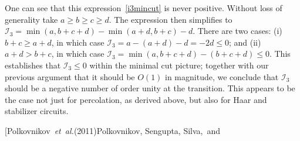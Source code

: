 \documentclass[prl,twocolumn,aps,showpacs,amsmath,amssymb,superscriptaddress,floatfix,longbibliography]{revtex4-1}
\begin{document}
One can see that this expression~\eqref{i3mincut} is never positive. Without loss of generality take $a \geq b \geq c \geq d$. The expression then simplifies to $\mathcal{I}_3 = \min(a, b + c + d)  - \min(a + d, b + c) - d$. There are two cases: (i)~$b + c \geq a + d$, in which case $\mathcal{I}_3 = a - (a + d) - d = - 2d \leq 0$; and (ii)~$a + d > b + c$, in which case $\mathcal{I}_3 = \min(a, b+c+d) - (b + c + d) \leq 0$. This establishes that $\mathcal{I}_3 \leq 0$ within the minimal cut picture; together with our previous argument that it should be $O(1)$ in magnitude, we conclude that $\mathcal{I}_3$ should be a negative number of order unity at the transition. This appears to be the case not just for percolation, as derived above, but also for Haar and stabilizer circuits. 


\begin{thebibliography}{39}\makeatletter
\providecommand \@ifxundefined [1]{\@ifx{#1\undefined}
}\providecommand \@ifnum [1]{\ifnum #1\expandafter \@firstoftwo
 \else \expandafter \@secondoftwo
 \fi
}\providecommand \@ifx [1]{\ifx #1\expandafter \@firstoftwo
 \else \expandafter \@secondoftwo
 \fi
}\providecommand \natexlab [1]{#1}\providecommand \enquote  [1]{``#1''}\providecommand \bibnamefont  [1]{#1}\providecommand \bibfnamefont [1]{#1}\providecommand \citenamefont [1]{#1}\providecommand \href@noop [0]{\@secondoftwo}\providecommand \href [0]{\begingroup \@sanitize@url \@href}\providecommand \@href[1]{\@@startlink{#1}\@@href}\providecommand \@@href[1]{\endgroup#1\@@endlink}\providecommand \@sanitize@url [0]{\catcode `\\12\catcode `\$12\catcode
  `\&12\catcode `\#12\catcode `\^12\catcode `\_12\catcode `\%12\relax}\providecommand \@@startlink[1]{}\providecommand \@@endlink[0]{}\providecommand \url  [0]{\begingroup\@sanitize@url \@url }\providecommand \@url [1]{\endgroup\@href {#1}{\urlprefix }}\providecommand \urlprefix  [0]{URL }\providecommand \Eprint [0]{\href }\providecommand \doibase [0]{http://dx.doi.org/}\providecommand \selectlanguage [0]{\@gobble}\providecommand \bibinfo  [0]{\@secondoftwo}\providecommand \bibfield  [0]{\@secondoftwo}\providecommand \translation [1]{[#1]}\providecommand \BibitemOpen [0]{}\providecommand \bibitemStop [0]{}\providecommand \bibitemNoStop [0]{.\EOS\space}\providecommand \EOS [0]{\spacefactor3000\relax}\providecommand \BibitemShut  [1]{\csname bibitem#1\endcsname}\let\auto@bib@innerbib\@empty
\bibitem [{\citenamefont {Polkovnikov}\ \emph {et~al.}(2011)\citenamefont
  {Polkovnikov}, \citenamefont {Sengupta}, \citenamefont {Silva},\ and\
}
\end{thebibliography}
\end{document}

